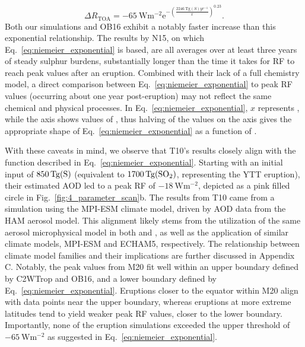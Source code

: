 \documentclass[draft]{agujournal2019}
\newcommand{\cwt}{C2WTrop}
\begin{document}
\begin{equation}
  \Delta
  R_{\mathrm{TOA}} =
  -\SI{65}{\watt\metre^{-2}}
  \mathrm{e}^{-{\left(\frac{\SI{2246}{\tera\gram(S)yr^{-1}}}{x}\right)}^{0.23}}.
  \label{eq:niemeier_exponential}
\end{equation}
%
Both our simulations and OB16 exhibit a notably faster increase than this exponential
relationship. The results by N15, on which Eq.~\ref{eq:niemeier_exponential} is based,
are all averages over at least three years of steady sulphur burdens, substantially
longer than the time it takes for RF to reach peak values after an eruption. Combined
with their lack of a full chemistry model, a direct comparison between
Eq.~\ref{eq:niemeier_exponential} to peak RF values (occurring about one year
post-eruption) may not reflect the same chemical and physical processes. In
Eq.~\ref{eq:niemeier_exponential}, \(x\) represents , while the axis shows values
of , thus halving of the  values on the axis gives the appropriate shape
of Eq.~\ref{eq:niemeier_exponential} as a function of .

With these caveats in mind, we observe that T10's results closely align with the
function described in Eq.~\ref{eq:niemeier_exponential}. Starting with an initial input
of \(\SI{850}{\tera\gram(\ce{S})}\) (equivalent to \(\SI{1700}{\tera\gram(\ce{SO2})}\),
representing the YTT eruption), their estimated AOD led to a peak RF of
\(\SI{-18}{\watt\meter^{-2}}\), depicted as a pink filled circle in
Fig.~\ref{fig:4_parameter_scan}b. The results from T10 came from a simulation using the
MPI-ESM climate model, driven by AOD data from the HAM aerosol model. This alignment
likely stems from the utilization of the same aerosol microphysical model in both
 and , as well as the application of similar
climate models, MPI-ESM and ECHAM5, respectively. The relationship between climate model
families and their implications are further discussed in Appendix C. Notably, the peak
values from M20 fit well within an upper boundary defined by \cwt{} and OB16, and a
lower boundary defined by Eq.~\ref{eq:niemeier_exponential}. Eruptions closer to the
equator within M20 align with data points near the upper boundary, whereas eruptions at
more extreme latitudes tend to yield weaker peak RF values, closer to the lower
boundary. Importantly, none of the eruption simulations exceeded the upper threshold of
\(\SI{-65}{\watt\meter^{-2}}\) as suggested in Eq.~\ref{eq:niemeier_exponential}.
\end{document}
